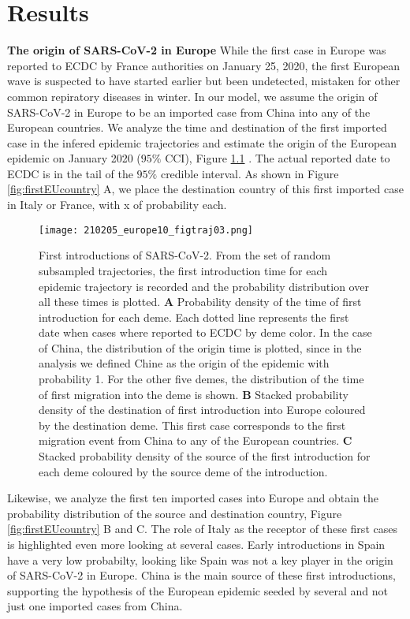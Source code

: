 \chapter{Results}

\textbf{The origin of SARS-CoV-2 in Europe} 
While the first case in Europe was reported to ECDC by France authorities on January 25, 2020, the first European wave is suspected to have started earlier but been undetected, mistaken for other common repiratory diseases in winter. In our model, we assume the origin of SARS-CoV-2 in Europe to be an imported case from China into any of the European countries. We analyze the time and destination of the first imported case in the infered epidemic trajectories and estimate the origin of the European epidemic on January 2020 ($95\%$ CCI), Figure \ref{fig:firstEU} . The actual reported date to ECDC is in the tail of the $95\%$ credible interval. As shown in Figure \ref{fig:firstEUcountry} A, we place the destination country of this first imported case in Italy or France, with x of probability each.  

\begin{figure}[h]
    \centering
    \texttt{[image: 210205\_europe10\_figtraj03.png]}
    \caption{First introductions of SARS-CoV-2. From the set of random subsampled trajectories, the first introduction time for each epidemic trajectory is recorded and the probability distribution over all these times is plotted. \textbf{A} Probability density of the time of first introduction for each deme. Each dotted line represents the first date when cases where reported to ECDC by deme color. In the case of China, the distribution of the origin time is plotted, since in the analysis we defined Chine as the origin of the epidemic with probability 1. For the other five demes, the distribution of the time of first migration into the deme is shown. \textbf{B} Stacked probability density of the destination of first introduction into Europe coloured by the destination deme. This first case corresponds to the first migration event from China to any of the European countries. \textbf{C} Stacked probability density of the source of the first introduction for each deme coloured by the source deme of the introduction.}
    \label{fig:firstEU}
\end{figure}

Likewise, we analyze the first ten imported cases into Europe and obtain the probability distribution of the source and destination country, Figure \ref{fig:firstEUcountry} B and C.  The role of Italy as the receptor of these first cases is highlighted even more looking at several cases. Early introductions in Spain have a very low probabilty, looking like Spain was not a key player in the origin of SARS-CoV-2 in Europe. China is the main source of these first introductions, supporting the hypothesis of the European epidemic seeded by several and not just one imported cases from China. 

